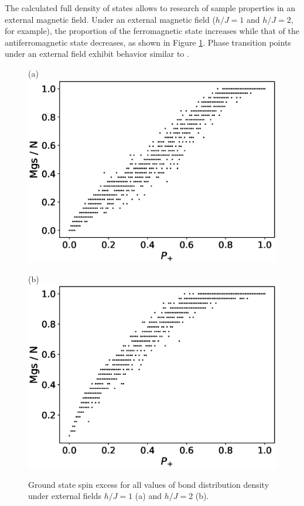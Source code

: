 \documentclass[preprint,12pt]{elsarticle}
\begin{document}
	The calculated full density of states allows to research of sample properties in an external magnetic field. Under an external magnetic field ($h/J = 1$ and $h/J = 2$, for example), the proportion of the ferromagnetic state increases while that of the antiferromagnetic state decreases, as shown in Figure \ref{fig:Mgs(P+)_H}. Phase transition points under an external field exhibit behavior similar to \cite{trukhin2024thermodynamic}.
	
	\begin{figure}[H]
		\begin{minipage}[h]{0.45\linewidth}
			\centering (a)
			\includegraphics[width=1\linewidth]{images/Mgs(P+)_H1.eps}
		\end{minipage}
		\hfill
		\begin{minipage}[h]{0.45\linewidth}
			\centering (b)
			\includegraphics[width=1\linewidth]{images/Mgs(P+)_H2.eps}
		\end{minipage}
		\caption{Ground state spin excess for all values of bond distribution density under external fields $h/J = 1$ (a) and $h/J = 2$ (b).}
		\label{fig:Mgs(P+)_H}
	\end{figure}
	
\end{document}
